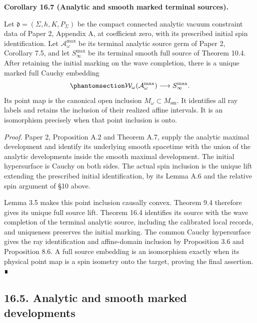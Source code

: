 \documentclass[
  english,
  11pt,
  reqno]{amsart}
\makeatletter
\newcommand{\pandocstatementheading}[1]{%
  \par\addpenalty{\@beginparpenalty}%
  \addvspace{.5\baselineskip plus .2\baselineskip minus .2\baselineskip}%
  {\normalfont\bfseries #1\par}%
  \nobreak\@afterindenttrue\@afterheading
}
\makeatother
\begin{document}
\pandocstatementheading{\protect{}\label{cor:analytic-smooth-terminal-source-inclusion}Corollary 16.7 (Analytic and smooth marked terminal sources).}

Let \(\mathfrak d=(\Sigma,h,K,P_\Sigma)\) be the compact connected
analytic vacuum constraint data of Paper 2, Appendix A, at coefficient
zero, with its prescribed initial spin identification. Let
\(\mathcal A^{\max}_\omega\) be its terminal analytic source germ of
Paper 2, Corollary 7.5, and let \(S^{\max}_\infty\) be its terminal
smooth full source of Theorem 10.4. After retaining the initial marking
on the wave completion, there is a unique marked full Cauchy embedding
\begin{equation}\protect\phantomsection\label{eq:analytic-smooth-terminal-full-embedding}{
\mathcal W_\omega(\mathcal A^{\max}_\omega)
\longrightarrow S^{\max}_\infty.
}\end{equation} Its point map is the canonical open inclusion
\(M_\omega\subset M_{\mathrm{sm}}\). It identifies all ray labels and
retains the inclusion of their realized affine intervals. It is an
isomorphism precisely when that point inclusion is onto.

\emph{Proof.} Paper 2, Proposition A.2 and Theorem A.7, supply the
analytic maximal development and identify its underlying smooth
spacetime with the union of the analytic developments inside the smooth
maximal development. The initial hypersurface is Cauchy on both sides.
The actual spin inclusion is the unique lift extending the prescribed
initial identification, by its Lemma A.6 and the relative spin argument
of §10 above.

Lemma 3.5 makes this point inclusion causally convex. Theorem 9.4
therefore gives its unique full source lift. Theorem 16.4 identifies its
source with the wave completion of the terminal analytic source,
including the calibrated local records, and uniqueness preserves the
initial marking. The common Cauchy hypersurface gives the ray
identification and affine-domain inclusion by Proposition 3.6 and
Proposition 8.6. A full source embedding is an isomorphism exactly when
its physical point map is a spin isometry onto the target, proving the
final assertion. ∎

\protect{}\label{sec:analytic-smooth-marked-development-equivalence}

\subsection{16.5. Analytic and smooth marked
developments}\label{analytic-and-smooth-marked-developments}
\end{document}
